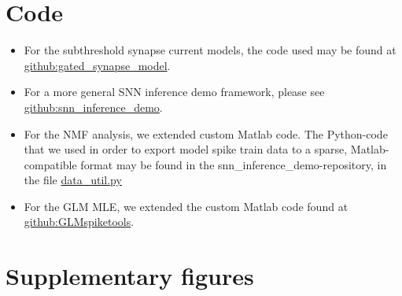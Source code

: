 \documentclass[mphil,deptreport,ianc]{infthesis} %
\begin{document}




\appendix

\chapter{Code}
\label{appendix:code}

\begin{itemize}
    \item For the subthreshold synapse current models, the code used may be found at \href{https://github.com/williampeer/gated_synapse_model}{github:gated\_synapse\_model}.
    \item For a more general SNN inference demo framework, please see \href{https://github.com/williampeer/snn_inference_demo}{github:snn\_inference\_demo}.
    \item For the NMF analysis, we extended custom Matlab code. The Python-code that we used in order to export model spike train data to a sparse, Matlab-compatible format may be found in the snn\_inference\_demo-repository, in the file \href{https://github.com/williampeer/snn_inference_demo/blob/master/data_util.py}{data\_util.py}
    \item For the GLM MLE, we extended the custom Matlab code found at \href{https://github.com/pillowlab/GLMspiketools}{github:GLMspiketools}.
\end{itemize}



\chapter{Supplementary figures}
\label{appendix:supplementary_material}
\end{document}
